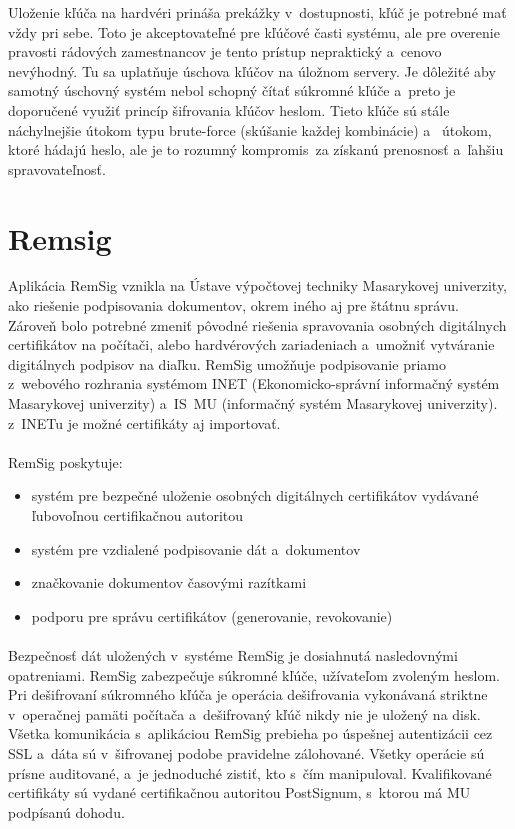 \documentclass[
  digital, %
  table,   %
oneside,
  nolof,     %
  nolot,     %
]{fithesis3}
\begin{document}
Uloženie kľúča na hardvéri prináša prekážky v~dostupnosti, kľúč je potrebné mať vždy pri sebe. Toto je akceptovateľné pre kľúčové časti systému, ale pre overenie pravosti rádových zamestnancov je tento prístup nepraktický a~cenovo nevýhodný. Tu sa uplatňuje úschova kľúčov na úložnom servery. Je dôležité aby samotný úschovný systém nebol schopný čítať súkromné kľúče a~preto je doporučené využiť princíp šifrovania kľúčov heslom. Tieto kľúče sú stále náchylnejšie útokom typu brute-force (skúšanie každej kombinácie) a~ útokom, ktoré hádajú heslo, ale je to rozumný kompromis~za získanú prenosnosť a~ľahšiu spravovateľnosť.
 
\section{Remsig}
Aplikácia RemSig \cite{remsigMuni} vznikla na Ústave výpočtovej techniky Masarykovej univerzity, ako riešenie podpisovania dokumentov, okrem iného aj pre štátnu správu. Zároveň bolo potrebné zmeniť pôvodné riešenia spravovania osobných digitálnych certifikátov na počítači, alebo hardvérových zariadeniach a~umožniť vytváranie digitálnych podpisov na diaľku. RemSig umožňuje podpisovanie priamo z~webového rozhrania systémom INET (Ekonomicko-správní informačný systém Masarykovej univerzity) a~IS~MU (informačný systém Masarykovej univerzity). z~INETu je možné certifikáty aj importovať.\paragraph{}
RemSig poskytuje:
\begin{itemize}
\item systém pre bezpečné uloženie osobných digitálnych certifikátov vydávané ľubovoľnou certifikačnou autoritou
\item systém pre vzdialené podpisovanie dát a~dokumentov
\item značkovanie dokumentov časovými razítkami 
\item podporu pre správu certifikátov (generovanie, revokovanie)

 \end{itemize}

\paragraph{}
Bezpečnosť dát uložených v~systéme RemSig je dosiahnutá nasledovnými opatreniami. RemSig zabezpečuje súkromné kľúče, užívateľom zvoleným heslom. Pri dešifrovaní súkromného kľúča je operácia dešifrovania vykonávaná striktne v~operačnej pamäti počítača a~dešifrovaný kľúč nikdy nie je uložený na disk. Všetka komunikácia s~aplikáciou RemSig prebieha po úspešnej autentizácii cez SSL a~dáta sú v~šifrovanej podobe pravidelne zálohované. Všetky operácie sú prísne auditované, a~je jednoduché zistiť, kto s~čím manipuloval. Kvalifikované certifikáty sú vydané certifikačnou autoritou PostSignum, s~ktorou má MU podpísanú dohodu.
\end{document}

